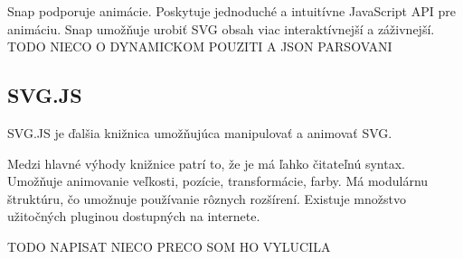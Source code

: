 
Snap podporuje animácie. Poskytuje jednoduché a intuitívne JavaScript API pre animáciu. Snap umožňuje urobiť SVG obsah viac interaktívnejší a záživnejší. \cite{snapsvg}
TODO NIECO O DYNAMICKOM POUZITI A JSON PARSOVANI




\subsection{SVG.JS}

SVG.JS je ďalšia knižnica umožňujúca manipulovať a animovať SVG.

Medzi hlavné výhody knižnice patrí to, že je má ľahko čitateľnú syntax. Umožňuje animovanie veľkosti, pozície, transformácie, farby. Má modulárnu štruktúru, čo umožnuje používanie rôznych rozšírení. Existuje množstvo užitočných pluginou dostupných na internete. \cite{svgjs}

TODO NAPISAT NIECO PRECO SOM HO VYLUCILA

%

